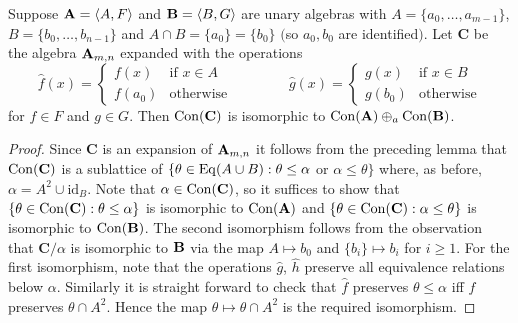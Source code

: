 
\begin{theorem}
  Suppose $\mathbf{A}=\langle A,F\rangle$ and $\mathbf{B}=\langle B,G\rangle$ are unary algebras with
  $A=\{a_0,\dots,a_{m-1}\}$, $B=\{b_0,\dots,b_{n-1}\}$ and 
  $A\cap B=\{a_0\}=\{b_0\}$ $($so $a_0,b_0$ are identified$)$. Let $\mathbf C$ be the
  algebra $\mathbf{A}_{m,n}$ expanded with the operations 
  $$
  \hat f(x)=\begin{cases}f(x)&\text{if $x\in A$}\\
  f(a_0)&\text{otherwise}\end{cases}\qquad\qquad
  \hat g(x)=\begin{cases}g(x)&\text{if $x\in B$}\\
  g(b_0)&\text{otherwise}\end{cases}
  $$
  for $f\in F$ and $g\in G$. Then $\operatorname{Con}(\mathbf C)$ is isomorphic to
  $\operatorname{Con}(\mathbf{A})\oplus_a\operatorname{Con}(\mathbf{B})$. 
\end{theorem}

\begin{proof}
  Since $\mathbf C$ is an expansion of $\mathbf{A}_{m,n}$ it follows from the preceding lemma
  that $\operatorname{Con}(\mathbf C)$ is a sublattice of 
  $\{\theta\in \operatorname{Eq}(A\cup B):\theta\le\alpha$ or $\alpha\le\theta\}$ where,
  as before, $\alpha=A^2\cup\text{id}_B$. Note that $\alpha\in\operatorname{Con}(\mathbf C)$,
  so it suffices to show that $\{\theta\in\operatorname{Con}(\mathbf C):\theta\le\alpha\}$ is
  isomorphic to $\operatorname{Con}(\mathbf{A})$ and $\{\theta\in\operatorname{Con}(\mathbf C):\alpha\le\theta\}$ 
  is isomorphic to $\operatorname{Con}(\mathbf{B})$. The second isomorphism follows from the
  observation that $\mathbf C/\alpha$ is isomorphic to $\mathbf{B}$ via the map 
  $A\mapsto b_0$ and $\{b_i\}\mapsto b_i$ for $i\ge 1$. For the first isomorphism,
  note that the operations $\hat g$, $\hat h$ preserve all equivalence relations
  below $\alpha$. Similarly it is straight forward to check that $\hat f$
  preserves $\theta\le\alpha$ iff $f$ preserves $\theta\cap A^2$. 
  Hence the map $\theta\mapsto\theta\cap A^2$ is the required isomorphism.
\end{proof}


